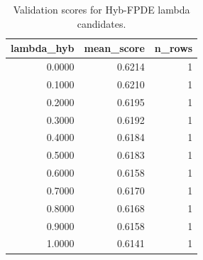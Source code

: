 \begin{table}[t]
\caption{Validation scores for Hyb-FPDE lambda candidates.}
\label{tab:lambda_distribution_computed}
\centering
\begin{tabular}{rrr}
\toprule
lambda\_hyb & mean\_score & n\_rows \\
\midrule
0.0000 & 0.6214 & 1 \\
0.1000 & 0.6210 & 1 \\
0.2000 & 0.6195 & 1 \\
0.3000 & 0.6192 & 1 \\
0.4000 & 0.6184 & 1 \\
0.5000 & 0.6183 & 1 \\
0.6000 & 0.6158 & 1 \\
0.7000 & 0.6170 & 1 \\
0.8000 & 0.6168 & 1 \\
0.9000 & 0.6158 & 1 \\
1.0000 & 0.6141 & 1 \\
\bottomrule
\end{tabular}

\end{table}
